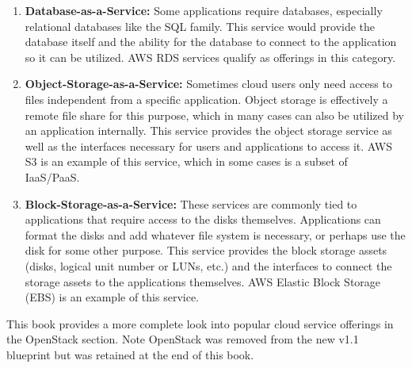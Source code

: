 \begin{enumerate}
  \item \textbf{Database-as-a-Service:} Some applications require databases,
  especially relational databases like the SQL family. This service would
  provide the database itself and the ability for the database to connect to
  the application so it can be utilized. AWS RDS services qualify as offerings
  in this category.
  \item \textbf{Object-Storage-as-a-Service:} Sometimes cloud users only need
  access to files independent from a specific application. Object storage is
  effectively a remote file share for this purpose, which in many cases can
  also be utilized by an application internally. This service provides the
  object storage service as well as the interfaces necessary for users
  and applications to access it. AWS S3 is an example of this service, which
  in some cases is a subset of IaaS/PaaS.
  \item \textbf{Block-Storage-as-a-Service:} These services are commonly tied to
  applications that require access to the disks themselves. Applications can
  format the disks and add whatever file system is necessary, or perhaps use
  the disk for some other purpose. This service provides the block storage
  assets (disks, logical unit number or LUNs, etc.) and the interfaces to
  connect the storage assets to the applications themselves. AWS Elastic Block
  Storage (EBS) is an example of this service.
\end{enumerate}

This book provides a more complete look into popular cloud service offerings
in the OpenStack section. Note OpenStack was removed from the new v1.1
blueprint but was retained at the end of this book.
